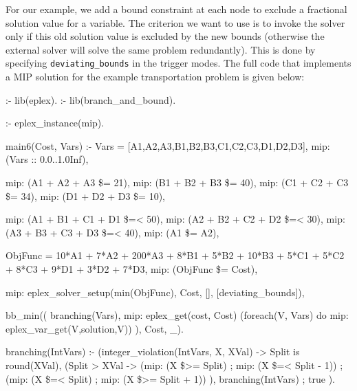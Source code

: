 For our example, we add a bound constraint at each node to exclude a
fractional solution value for a variable. The criterion we want to use is
to invoke the solver only if this old solution value is excluded by the new
bounds (otherwise the external solver will solve the same problem
redundantly). This is done by
specifying \verb'deviating_bounds' in the trigger modes.
The full code that
implements a MIP solution for the
example transportation problem is given below: 
{\small
\begin{code}
:- lib(eplex).
:- lib(branch_and_bound).

:- eplex_instance(mip).

main6(Cost, Vars) :-
        Vars = [A1,A2,A3,B1,B2,B3,C1,C2,C3,D1,D2,D3], 
        mip: (Vars :: 0.0..1.0Inf),

        mip: (A1 + A2 + A3 \$= 21),
        mip: (B1 + B2 + B3 \$= 40),
        mip: (C1 + C2 + C3 \$= 34),
        mip: (D1 + D2 + D3 \$= 10),

        mip: (A1 + B1 + C1 + D1 \$=< 50),
        mip: (A2 + B2 + C2 + D2 \$=< 30),
        mip: (A3 + B3 + C3 + D3 \$=< 40),
        mip: (A1 \$= A2),

        ObjFunc = 10*A1 + 7*A2 + 200*A3 + 
                   8*B1 + 5*B2 + 10*B3 +
                   5*C1 + 5*C2 +  8*C3 + 
                   9*D1 + 3*D2 +  7*D3,
        mip: (ObjFunc  \$= Cost),

        mip: eplex_solver_setup(min(ObjFunc), Cost, [], [deviating_bounds]),

        bb_min(( branching(Vars), 
                 mip: eplex_get(cost, Cost)
                 (foreach(V, Vars) do mip: eplex_var_get(V,solution,V))
               ), Cost, _).

branching(IntVars) :-
        (integer_violation(IntVars, X, XVal) ->
            Split is round(XVal),
            (Split > XVal ->
                (mip: (X \$>= Split) ;  mip: (X \$=< Split - 1))
            ;
                (mip: (X \$=< Split) ; mip:  (X \$>= Split + 1))
            ),
            branching(IntVars)
        ;
            true
        ).


\end{code}}
